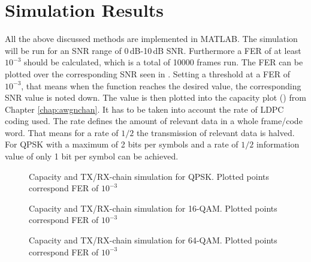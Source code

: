 \section{Simulation Results}
All the above discussed methods are implemented in MATLAB.
The simulation will be run for an SNR range of 0\,dB-10\,dB SNR. Furthermore a \gls{FER} of at least $10^{-3}$ should be calculated, which is a total of 10000 frames run. The \gls{FER} can be plotted over the corresponding \gls{SNR} seen in .  
\newline
Setting a threshold at a \gls{FER} of $10^{-3}$, that means when the function reaches the desired value, the corresponding \gls{SNR} value is noted down. The value is then plotted into the capacity plot () from Chapter \ref{chap:awgnchan}. It has to be taken into account the rate of \gls{LDPC} coding used. The rate defines the amount of relevant data in a whole frame/code word. That means for a rate of $1/2$ the transmission of relevant data is halved. For QPSK with a maximum of 2 bits per symbols and a rate of $1/2$ information value of only 1 bit per symbol can be achieved.
\newline
\begin{figure}[!htb]
	\setlength{}
	\setlength\fheight{0.4\textheight}
	\centering
	
	\caption{Capacity and TX/RX-chain simulation for QPSK. Plotted points correspond FER of $10^{-3}$}
	\label{fig:llr1}
\end{figure}
\begin{figure}[!htb]
	\setlength{}
	\setlength\fheight{0.4\textheight}	
	\centering
	
	\caption{Capacity and TX/RX-chain simulation for 16-QAM. Plotted points correspond FER of $10^{-3}$}
	\label{fig:llr2}
\end{figure}
\begin{figure}[!h]
	\setlength{}
	\setlength\fheight{0.4\textheight}
	\centering
	
	\caption{Capacity and TX/RX-chain simulation for 64-QAM. Plotted points correspond FER of $10^{-3}$}
	\label{fig:llr3}
\end{figure}

